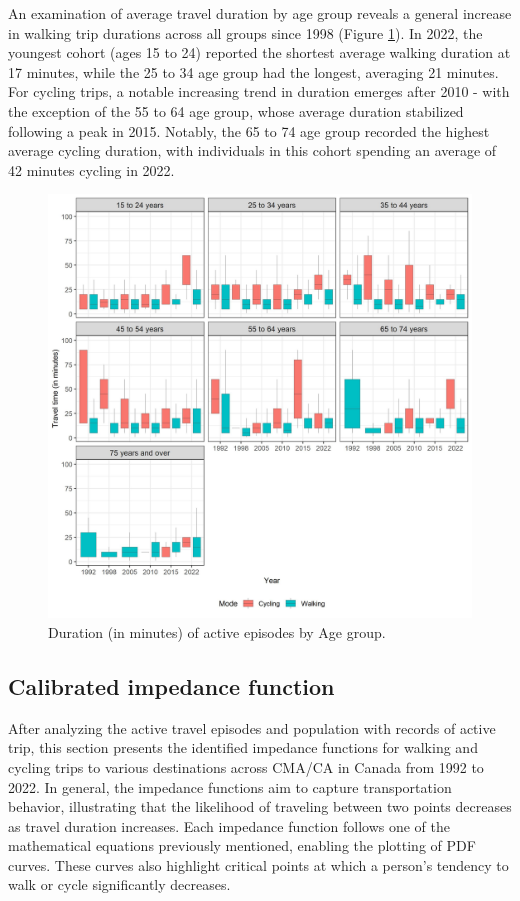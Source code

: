 \documentclass[preprint, 3p,
authoryear]{elsarticle} %
\begin{document}
An examination of average travel duration by age group reveals a general
increase in walking trip durations across all groups since 1998 (Figure
\ref{fig:age-dur-figure}). In 2022, the youngest cohort (ages 15 to 24)
reported the shortest average walking duration at 17 minutes, while the
25 to 34 age group had the longest, averaging 21 minutes. For cycling
trips, a notable increasing trend in duration emerges after 2010 - with
the exception of the 55 to 64 age group, whose average duration
stabilized following a peak in 2015. Notably, the 65 to 74 age group
recorded the highest average cycling duration, with individuals in this
cohort spending an average of 42 minutes cycling in 2022.

\begin{figure}
\includegraphics[width=1\linewidth]{figures/age_duration_boxplots} \caption{Duration (in minutes) of active episodes by Age group.}\label{fig:age-dur-figure}
\end{figure}

\subsection{Calibrated impedance
function}\label{calibrated-impedance-function}

After analyzing the active travel episodes and population with records
of active trip, this section presents the identified impedance functions
for walking and cycling trips to various destinations across CMA/CA in
Canada from 1992 to 2022. In general, the impedance functions aim to
capture transportation behavior, illustrating that the likelihood of
traveling between two points decreases as travel duration increases.
Each impedance function follows one of the mathematical equations
previously mentioned, enabling the plotting of PDF curves. These curves
also highlight critical points at which a person's tendency to walk or
cycle significantly decreases.
\end{document}
